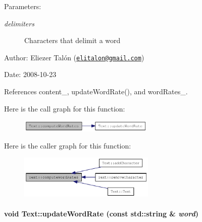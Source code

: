 \begin{Desc}
\item[Parameters:]
\begin{description}
\item[{\em delimiters}]Characters that delimit a word\end{description}
\end{Desc}
\begin{Desc}
\item[Author:]Eliezer Talón (\href{mailto:elitalon@gmail.com}{\tt elitalon@gmail.com}) \end{Desc}
\begin{Desc}
\item[Date:]2008-10-23 \end{Desc}


References content\_\-, updateWordRate(), and wordRates\_\-.

Here is the call graph for this function:\nopagebreak
\begin{figure}[H]
\begin{center}
\leavevmode
\includegraphics[width=182pt]{class_text_e954a35628c72537e2ee5ca6e9609ac1_cgraph}
\end{center}
\end{figure}


Here is the caller graph for this function:\nopagebreak
\begin{figure}[H]
\begin{center}
\leavevmode
\includegraphics[width=184pt]{class_text_e954a35628c72537e2ee5ca6e9609ac1_icgraph}
\end{center}
\end{figure}
\hypertarget{class_text_5ab8f9bfa566de537a167991fe10eff5}{
\paragraph[updateWordRate]{\setlength{\rightskip}{0pt plus 5cm}void Text::updateWordRate (const std::string \& {\em word})}\hfill}
\label{class_text_5ab8f9bfa566de537a167991fe10eff5}


